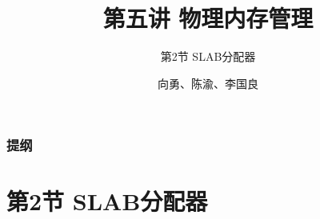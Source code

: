 


\title[第5讲]{第五讲 物理内存管理} %
\subtitle{第2节 SLAB分配器}
\author{向勇、陈渝、李国良} %



\begin{frame}
\titlepage %
\end{frame}

\begin{frame}
\frametitle{提纲} %
\tableofcontents %
\end{frame}

\section{第2节 SLAB分配器}%
